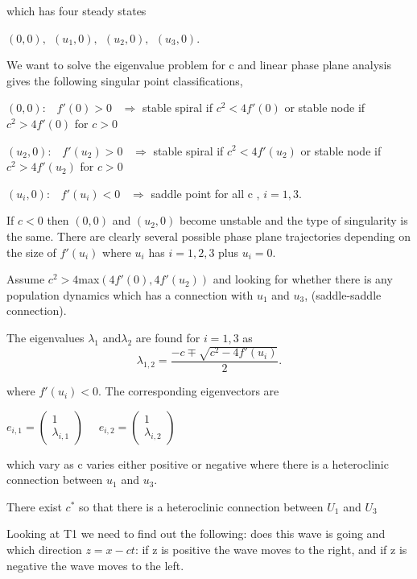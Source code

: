 \documentclass[]{article}
\numberwithin{equation}{section}		%
\begin{document}
\noindent which has four steady states

\begin{center}
$(0, 0),\ \  (u_1, 0),\ \  (u_2, 0),\ \  (u_3, 0)$.\\
\end{center}

We want to solve the eigenvalue problem for c and linear phase plane analysis gives the following singular point classifications,

$(0,0):$ \ $ f'(0)> 0 $ \ $ \Rightarrow$ stable spiral if $c^2<4 f'(0)$ or stable node if $c^2> 4f'(0)$ for $c>0$

$(u_2,0):$ \ $ f'(u_2)> 0 $ \ $ \Rightarrow$ stable spiral if $c^2<4 f'(u_2)$ or stable node if $c^2> 4f'(u_2)$ for $c>0$

$(u_i,0):$ \ $ f'(u_i)< 0 $ \ $ \Rightarrow$ saddle point for all c , $i=1,3$.

If $c < 0$ then $(0, 0)$ and $(u_2, 0)$ become unstable and the type of singularity is the same.
There are clearly several possible phase plane trajectories depending on the size of $f'(u_i )$ where $u_i$ has $i = 1, 2, 3$ plus $u_i = 0.$

Assume $c^2 > 4 $max$ (4f'(0),4f'(u_2))$ and looking for whether there is any population dynamics which has a connection with $u_1$ and $u_3$, (saddle-saddle connection).

The eigenvalues $\lambda_1$ and$\lambda_2$ are found for $i=1,3$ as
\begin{equation}
\lambda_{1,2} = \frac{-c \mp \sqrt{c^2-4f'(u_i)} }{2}.
\end{equation}

where $f'(u_i)<0$. The corresponding eigenvectors are
\begin{center}
$e_{i,1}= \begin{pmatrix} 1 \\ \lambda_{i,1} \end{pmatrix} $ \ \ $e_{i,2}= \begin{pmatrix} 1 \\ \lambda_{i,2} \end{pmatrix} $
\end{center}

which vary as c varies either positive or negative where there is a heteroclinic connection between $u_1$ and $u_3$.

There exist $c^*$ so that there is a heteroclinic connection between $U_1$ and $U_3$

Looking at T1 we need to find out the following: does this wave is going and which direction $z = x - ct$: if z is positive the wave moves to the right, and if z is negative the wave moves to the left.
\end{document}
